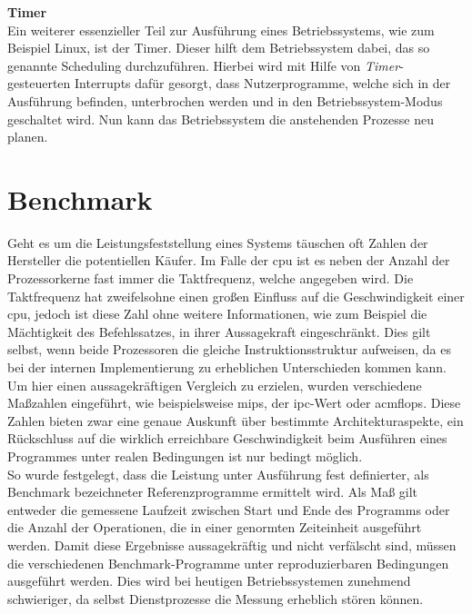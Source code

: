 \newpage
\textbf{Timer}\\
Ein weiterer essenzieller Teil zur Ausführung eines Betriebssystems, wie zum Beispiel Linux, ist der Timer. Dieser hilft dem Betriebssystem dabei, das so genannte Scheduling
durchzuführen. Hierbei wird mit Hilfe von \emph{Timer}-gesteuerten Interrupts dafür gesorgt, dass Nutzerprogramme, welche sich in der Ausführung befinden, unterbrochen werden und
in den Betriebssystem-Modus geschaltet wird. Nun kann das Betriebssystem die anstehenden Prozesse neu planen.\\










\section{Benchmark}\label{kap:benchmark}
Geht es um die Leistungsfeststellung eines Systems täuschen oft Zahlen der Hersteller die potentiellen Käufer. Im Falle der \ac{cpu} ist es neben der Anzahl der Prozessorkerne
 fast immer die Taktfrequenz, welche angegeben wird.
Die Taktfrequenz hat zweifelsohne einen großen Einfluss auf die Geschwindigkeit einer \ac{cpu}, jedoch ist diese Zahl ohne weitere Informationen, wie zum Beispiel die
Mächtigkeit des Befehlssatzes, in ihrer Aussagekraft eingeschränkt. Dies gilt selbst, wenn beide Prozessoren die gleiche Instruktionsstruktur aufweisen, da es bei der
internen Implementierung zu erheblichen Unterschieden kommen kann. \\
Um hier einen aussagekräftigen Vergleich zu erzielen, wurden verschiedene Maßzahlen eingeführt, wie beispielsweise \ac{mips}, der \ac{ipc}-Wert oder ac{mflops}. Diese
 Zahlen bieten zwar eine genaue Auskunft über bestimmte Architekturaspekte, ein Rückschluss auf die wirklich erreichbare Geschwindigkeit beim Ausführen eines Programmes
 unter realen Bedingungen ist nur bedingt möglich. \\
So wurde festgelegt, dass die Leistung unter Ausführung fest definierter, als Benchmark bezeichneter Referenzprogramme ermittelt wird. Als Maß gilt entweder die gemessene
 Laufzeit zwischen Start und Ende des Programms oder die Anzahl der Operationen, die in einer genormten Zeiteinheit ausgeführt werden. Damit diese Ergebnisse aussagekräftig
 und nicht verfälscht sind, müssen die verschiedenen Benchmark-Programme unter reproduzierbaren Bedingungen ausgeführt werden. Dies wird bei heutigen Betriebssystemen zunehmend
  schwieriger, da selbst Dienstprozesse die Messung erheblich stören können.~\cite{benchmark}

